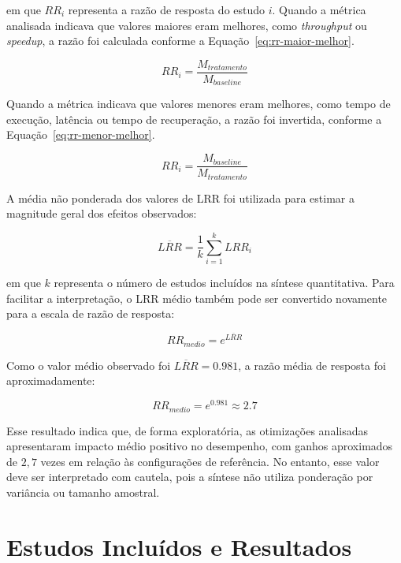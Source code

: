 em que $RR_i$ representa a razão de resposta do estudo $i$. Quando a métrica analisada indicava que valores maiores eram melhores, como \textit{throughput} ou \textit{speedup}, a razão foi calculada conforme a Equação~\ref{eq:rr-maior-melhor}.

\begin{equation}
RR_i = \frac{M_{tratamento}}{M_{baseline}}
\label{eq:rr-maior-melhor}
\end{equation}

Quando a métrica indicava que valores menores eram melhores, como tempo de execução, latência ou tempo de recuperação, a razão foi invertida, conforme a Equação~\ref{eq:rr-menor-melhor}.

\begin{equation}
RR_i = \frac{M_{baseline}}{M_{tratamento}}
\label{eq:rr-menor-melhor}
\end{equation}

A média não ponderada dos valores de LRR foi utilizada para estimar a magnitude geral dos efeitos observados:

\begin{equation}
\overline{LRR} = \frac{1}{k}\sum_{i=1}^{k} LRR_i
\label{eq:lrr-medio}
\end{equation}

em que $k$ representa o número de estudos incluídos na síntese quantitativa. Para facilitar a interpretação, o LRR médio também pode ser convertido novamente para a escala de razão de resposta:

\begin{equation}
RR_{medio} = e^{\overline{LRR}}
\label{eq:rr-medio}
\end{equation}

Como o valor médio observado foi $\overline{LRR} = 0.981$, a razão média de resposta foi aproximadamente:

\begin{equation}
RR_{medio} = e^{0.981} \approx 2.7
\label{eq:rr-resultado}
\end{equation}

Esse resultado indica que, de forma exploratória, as otimizações analisadas apresentaram impacto médio positivo no desempenho, com ganhos aproximados de $2,7$ vezes em relação às configurações de referência. No entanto, esse valor deve ser interpretado com cautela, pois a síntese não utiliza ponderação por variância ou tamanho amostral.

\section{Estudos Incluídos e Resultados}
\label{sec:rsl-estudos-incluidos}

